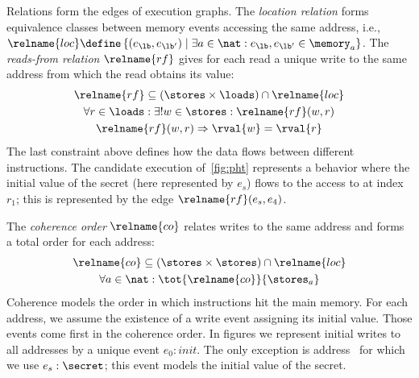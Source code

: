 \documentclass[conference]{IEEEtran}
\begin{document}
Relations form the edges of execution graphs.
The \emph{location relation}  forms equivalence classes between memory events accessing the same address, i.e., $\relname{loc} \define \left\{ (e_\lb,e_{\lb'}) \mid \exists a \in \nat : e_\lb, e_{\lb'} \in \memory_a \right\}$.
The \emph{reads-from relation} $\relname{rf}$ gives for each read a unique write to the same address from which the read obtains its value:
\begin{gather*}
\relname{rf} \subseteq (\stores \times \loads) \cap \relname{loc}\\
\forall r \in \loads : {\exists! w \in \stores : {\relname{rf}(w,r)}}\\
\relname{rf}(w,r) \Rightarrow \rval{w} = \rval{r}
\end{gather*}
The last constraint above defines how the data flows between different instructions.
The candidate execution of~\autoref{fig:pht} represents a behavior where the initial value of the secret (here represented by $e_s$) flows to the access to \varA at index $r_1$; this is represented by the edge $\relname{rf}(e_s,e_4)$.

The \emph{coherence order} $\relname{co}$ relates writes to the same address and forms a total order for each address:
\begin{gather*}
\relname{co} \subseteq (\stores \times \stores) \cap \relname{loc}\\
\forall a \in \nat : \tot{\relname{co}}{\stores_{a}}
\end{gather*}
Coherence models the order in which \store instructions hit the main memory.
For each address, we assume the existence of a write event assigning its initial value. 
Those events come first in the coherence order.  
In figures we represent initial writes to all addresses by a unique event $e_0: \mathit{init}$.
The only exception is address \secret\ for which we use $e_s:\secret$; this event models the initial value of the secret.
\end{document}
